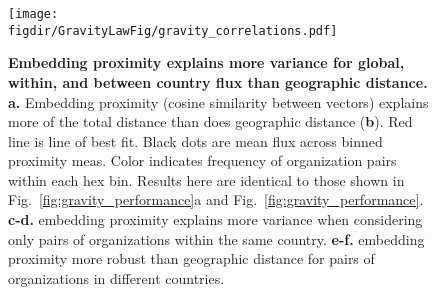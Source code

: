 \documentclass[12pt]{article} %
\def\figdir{../Figs}
\begin{document}
\newpage
%
%
\begin{figure}[p!]
	\centering
	\label{fig:supp:gravity_correlation}
	\texttt{[image: \\figdir/GravityLawFig/gravity\_correlations.pdf]}
	\caption{
		\textbf{Embedding proximity explains more variance for global, within, and between country flux than geographic distance.}
		\textbf{a.}
		Embedding proximity (cosine similarity between vectors) explains more of the total distance than does geographic distance (\textbf{b}). 
		Red line is line of best fit. 
		Black dots are mean flux across binned proximity meas.
		Color indicates frequency of organization pairs within each hex bin.
		Results here are identical to those shown in Fig.~\ref{fig:gravity_performance}a and Fig.~\ref{fig:gravity_performance}.
		\textbf{c-d.}	embedding proximity explains more variance when considering only pairs of organizations within the same country. 
		\textbf{e-f.} embedding proximity more robust than geographic distance for pairs of organizations in different countries. 
	}
\end{figure}

\clearpage
\printbibliography{}
    
\end{document}
